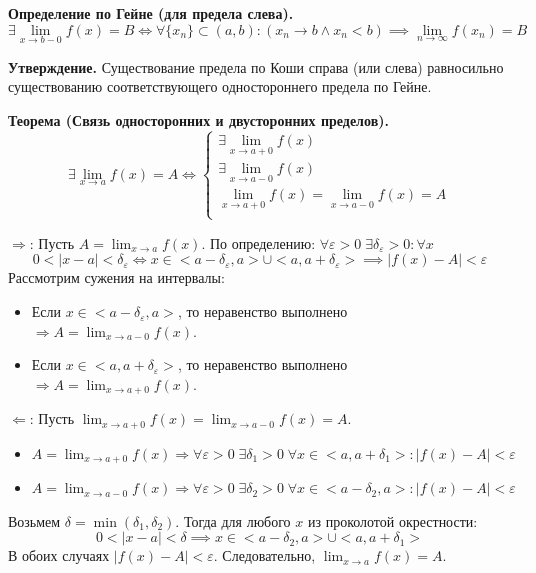 \begin{tcolorbox}
	\textbf{Определение по Гейне (для предела слева).} 
	\[ \exists \lim_{x \to b - 0} f(x) = B \Leftrightarrow \forall \{x_n\} \subset (a, b): (x_n \to b \land x_n < b) \implies \lim_{n \to \infty} f(x_n) = B \]
\end{tcolorbox}

\textbf{Утверждение.} Существование предела по Коши справа (или слева) равносильно существованию соответствующего одностороннего предела по Гейне.

\textbf{Теорема (Связь односторонних и двусторонних пределов).}
\[ \exists \lim_{x \to a} f(x) = A \Leftrightarrow
\begin{cases}
	\exists \lim_{x \to a + 0} f(x)\\
	\exists \lim_{x \to a - 0} f(x)\\
	\lim_{x \to a + 0} f(x) = \lim_{x \to a - 0} f(x) = A\\
\end{cases} 
\]

\begin{tcolorbox}[title=Доказательство]
	$\Rightarrow$: Пусть $A = \lim_{x \to a} f(x)$. 
	По определению: $\forall \varepsilon > 0\; \exists \delta_\varepsilon > 0: \forall x$
	\[ 0 < |x - a| < \delta_\varepsilon \Leftrightarrow x \in <a - \delta_\varepsilon, a> \cup <a, a + \delta_\varepsilon> \implies |f(x) - A| < \varepsilon \]
	Рассмотрим сужения на интервалы:
	\begin{itemize}
	    \item Если $x \in <a - \delta_\varepsilon, a>$, то неравенство выполнено $\Rightarrow A = \lim_{x \to a - 0} f(x)$.
	    \item Если $x \in <a, a + \delta_\varepsilon>$, то неравенство выполнено $\Rightarrow A = \lim_{x \to a + 0} f(x)$.
	\end{itemize}

	$\Leftarrow$: Пусть $\lim_{x \to a + 0} f(x) = \lim_{x \to a - 0} f(x) = A$.
	\begin{itemize}
	    \item $A = \lim_{x \to a + 0} f(x) \Rightarrow \forall \varepsilon > 0\; \exists \delta_1 > 0\; \forall x \in <a, a + \delta_1>: |f(x) - A| < \varepsilon$
	    \item $A = \lim_{x \to a - 0} f(x) \Rightarrow \forall \varepsilon > 0\; \exists \delta_2 > 0\; \forall x \in <a - \delta_2, a>: |f(x) - A| < \varepsilon$
	\end{itemize}
	Возьмем $\delta = \min(\delta_1, \delta_2)$. Тогда для любого $x$ из проколотой окрестности:
	\[ 0 < |x - a| < \delta \implies x \in <a-\delta_2, a> \cup <a, a+\delta_1> \]
	В обоих случаях $|f(x) - A| < \varepsilon$.
	Следовательно, $\lim_{x \to a} f(x) = A$.
\end{tcolorbox}
